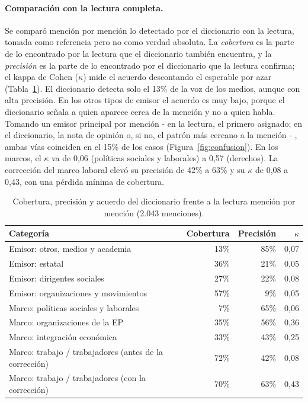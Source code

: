 \documentclass[11pt,a4paper]{article}
\begin{document}
\paragraph{Comparación con la lectura completa.} Se comparó mención por mención lo detectado por el diccionario con la lectura, tomada como referencia pero no como verdad absoluta. La \emph{cobertura} es la parte de lo encontrado por la lectura que el diccionario también encuentra, y la \emph{precisión} es la parte de lo encontrado por el diccionario que la lectura confirma; el kappa de Cohen ($\kappa$) mide el acuerdo descontando el esperable por azar (Tabla~\ref{tab:cobertura}). El diccionario detecta solo el 13\% de la voz de los medios, aunque con alta precisión. En los otros tipos de emisor el acuerdo es muy bajo, porque el diccionario señala a quien aparece cerca de la mención y no a quien habla. Tomando un emisor principal por mención - en la lectura, el primero asignado; en el diccionario, la nota de opinión o, si no, el patrón más cercano a la mención - , ambas vías coinciden en el 15\% de los casos (Figura~\ref{fig:confusion}). En los marcos, el $\kappa$ va de 0,06 (políticas sociales y laborales) a 0,57 (derechos). La corrección del marco laboral elevó su precisión de 42\% a 63\% y su $\kappa$ de 0,08 a 0,43, con una pérdida mínima de cobertura.

\begin{table}[h]
\centering\small
\caption{Cobertura, precisión y acuerdo del diccionario frente a la lectura mención por mención (2.043 menciones).}
\label{tab:cobertura}
\begin{tabular}{lrrr}
\toprule
\textbf{Categoría} & \textbf{Cobertura} & \textbf{Precisión} & $\kappa$ \\
\midrule
Emisor: otros, medios y academia & 13\% & 85\% & 0,07 \\
Emisor: estatal & 36\% & 21\% & 0,05 \\
Emisor: dirigentes sociales & 27\% & 22\% & 0,08 \\
Emisor: organizaciones y movimientos & 57\% & 9\% & 0,05 \\
Marco: políticas sociales y laborales & 7\% & 65\% & 0,06 \\
Marco: organizaciones de la EP & 35\% & 56\% & 0,36 \\
Marco: integración económica & 33\% & 43\% & 0,25 \\
Marco: trabajo / trabajadores (antes de la corrección) & 72\% & 42\% & 0,08 \\
Marco: trabajo / trabajadores (con la corrección) & 70\% & 63\% & 0,43 \\
\bottomrule
\end{tabular}
\end{table}
\end{document}
